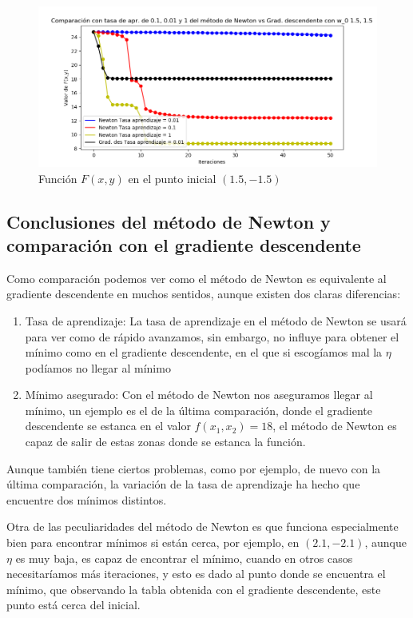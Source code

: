 \documentclass[12pt, spanish]{article}
\begin{document}
\begin{figure}[H]
  \centering
      \includegraphics[scale = 0.70]{ej3-4.png}
 		 \caption{Función $F(x,y)$ en el punto inicial $(1.5,-1.5)$}
  		\label{fig:ej3-4}

\end{figure}

\subsection{Conclusiones del método de Newton y comparación con el gradiente descendente}

Como comparación podemos ver como el método de Newton es equivalente al gradiente descendente en muchos sentidos, aunque existen dos claras diferencias:

\begin{enumerate}
	\item {Tasa de aprendizaje: La tasa de aprendizaje en el método de Newton se usará para ver como de rápido avanzamos, sin embargo, no influye para obtener el mínimo como en el gradiente descendente, en el que si escogíamos mal la $\eta$ podíamos no llegar al mínimo}
	\item{Mínimo asegurado: Con el método de Newton nos aseguramos llegar al mínimo, un ejemplo es el de la última comparación, donde el gradiente descendente se estanca en el valor $f(x_1, x_2) = 18$, el método de Newton es capaz de salir de estas zonas donde se estanca la función.}
\end{enumerate}

Aunque también tiene ciertos problemas, como por ejemplo, de nuevo con la última comparación, la variación de la tasa de aprendizaje ha hecho que encuentre dos mínimos distintos.

Otra de las peculiaridades del método de Newton es que funciona especialmente bien para encontrar mínimos si están cerca, por ejemplo, en $(2.1, -2.1)$, aunque $\eta$ es muy baja, es capaz de encontrar el mínimo, cuando en otros casos necesitaríamos más iteraciones, y esto es dado al punto donde se encuentra el mínimo, que observando la tabla obtenida con el gradiente descendente, este punto está cerca del inicial.
\end{document}
